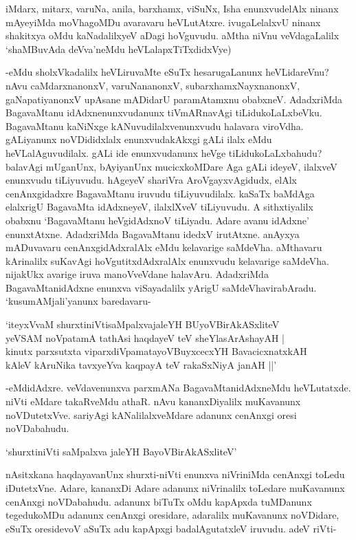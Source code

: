 iMdarx, mitarx, varuNa, anila, barxhamx, viSuNx, Isha enunxvudelAlx ninanx mAyeyiMda moVhagoMDu avaravaru heVLutAtxre. ivugaLelalxvU ninanx shakitxya oMdu kaNadalilxyeV aDagi hoVguvudu. aMtha niVnu veVdagaLalilx `shaMBuvAda deVva'neMdu heVLalapxTiTxdidxVye)

-eMdu sholxVkadalilx heVLiruvaMte eSuTx hesarugaLanunx heVLidareVnu? nAvu caMdarxnanonxV, varuNananonxV, subarxhamxNayxnanonxV, gaNapatiyanonxV upAsane mADidarU paramAtamxnu obabxneV. AdadxriMda BagavaMtanu idAdxnenunxvudanunx tiVmARnavAgi tiLidukoLaLxbeVku. BagavaMtanu kaNiNxge kANuvudilalxvenunxvudu halavara viroVdha. gALiyanunx noVDididxlalx enunxvudakAkxgi gALi ilalx eMdu heVLalAguvudilalx. gALi ide enunxvudanunx heVge tiLidukoLaLxbahudu? balavAgi mUganUnx, bAyiyanUnx mucicxkoMDare Aga gALi ideyeV, ilalxveV enunxvudu tiLiyuvudu. hAgeyeV shariVra AroVgayxvAgidudx, elAlx cenAnxgidadxre BagavaMtanu iruvudu tiLiyuvudilalx. kaSaTx baMdAga elalxrigU BagavaMta idAdxneyeV, ilalxlXveV tiLiyuvudu. A sithxtiyalilx obabxnu `BagavaMtanu heVgidAdxnoV tiLiyadu. Adare avanu idAdxne' enunxtAtxne. AdadxriMda BagavaMtanu idedxV irutAtxne. anAyxya mADuvavaru cenAnxgidAdxralAlx eMdu kelavarige saMdeVha. aMthavaru kArinalilx suKavAgi hoVgutitxdAdxralAlx enunxvudu kelavarige saMdeVha. nijakUkx avarige iruva manoVveVdane halavAru. AdadxriMda BagavaMtanidAdxne enunxva viSayadalilx yArigU saMdeVhavirabAradu. `kusumAMjali'yanunx baredavaru-

\begin{shloka}
`iteyxVvaM shurxtiniVtisaMpalxvajaleYH BUyoVBirAkASxliteV\\
yeVSAM noVpatamA tathAsi haqdayeV teV sheYlasArAshayAH |\\
kinutx parxsutxta viparxdiVpamatayoVBuyxcecxYH BavacicxnatxkAH\\
kAleV kAruNika tavxyeYva kaqpayA teV rakaSxNiyA janAH ||'
\end{shloka}

-eMdidAdxre. veVdavenunxva parxmANa BagavaMtanidAdxneMdu heVLutatxde. niVti eMdare takaRveMdu athaR. nAvu kananxDiyalilx muKavanunx noVDutetxVve. sariyAgi kANalilalxveMdare adanunx cenAnxgi oresi noVDabahudu.

\begin{shloka}
`shurxtiniVti saMpalxva jaleYH BayoVBirAkASxliteV'
\end{shloka}

nAsitxkana haqdayavanUnx shurxti-niVti enunxva niVriniMda cenAnxgi toLedu iDutetxVne. Adare, kananxDi Adare adanunx niVrinalilx toLedare muKavanunx cenAnxgi noVDabahudu. adanunx biTuTx oMdu kapApxda tuMDanunx tegedukoMDu adanunx cenAnxgi oresidare, adaralilx muKavanunx noVDidare, eSuTx oresidevoV aSuTx adu kapApxgi badalAgutatxleV iruvudu. adeV riVti-

